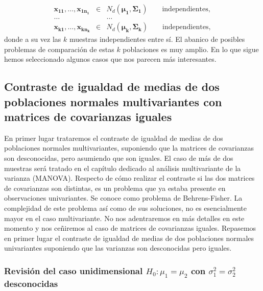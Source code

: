 \documentclass[
  a4paper,
  oneside]{scrbook}
\theoremstyle{definition}
\theoremstyle{definition}
\theoremstyle{definition}
\theoremstyle{definition}
\theoremstyle{remark}
\begin{document}
\[\begin{aligned}
\bm{x_{11}},\ldots,\bm{x_{1n_1}}&\in & N_d(\bm{\mu_1},\bm{\Sigma_1}) \qquad \mbox{independientes},\\
\ldots && \ldots \\
\bm{x_{k1}},\ldots,\bm{x_{kn_k}}&\in & N_d(\bm{\mu_k},\bm{\Sigma_k}) \qquad \mbox{independientes},\end{aligned}\]
donde a su vez las \(k\) muestras independientes entre sí. El abanico de
posibles problemas de comparación de estas \(k\) poblaciones es muy
amplio. En lo que sigue hemos seleccionado algunos casos que nos parecen
más interesantes.

\subsection{Contraste de igualdad de medias de dos poblaciones normales multivariantes con matrices de covarianzas iguales}\label{contraste-de-igualdad-de-medias-de-dos-poblaciones-normales-multivariantes-con-matrices-de-covarianzas-iguales}

En primer lugar trataremos el contraste de igualdad de medias de dos
poblaciones normales multivariantes, suponiendo que la matrices de
covarianzas son desconocidas, pero asumiendo que son iguales. El caso de
más de dos muestras será tratado en el capítulo dedicado al análisis
multivariante de la varianza (MANOVA). Respecto de cómo realizar el
contraste si las dos matrices de covarianzas son distintas, es un
problema que ya estaba presente en observaciones univariantes. Se conoce
como problema de Behrens-Fisher. La complejidad de este problema así
como de sus soluciones, no es esencialmente mayor en el caso
multivariante. No nos adentraremos en más detalles en este momento y nos
ceñiremos al caso de matrices de covarianzas iguales. Repasemos en
primer lugar el contraste de igualdad de medias de dos poblaciones
normales univariantes suponiendo que las varianzas son desconocidas pero
iguales.

\subsubsection{\texorpdfstring{Revisión del caso unidimensional \(H_0:\mu_1=\mu_2\) con \(\sigma_1^2=\sigma_2^2\) desconocidas}{Revisión del caso unidimensional H\_0:\textbackslash mu\_1=\textbackslash mu\_2 con \textbackslash sigma\_1\^{}2=\textbackslash sigma\_2\^{}2 desconocidas}}\label{revision-del-caso-unidimensional-h-0-mu-1-mu-2-con-sigma-1-2-sigma-2-2-desconocidas}
\end{document}
